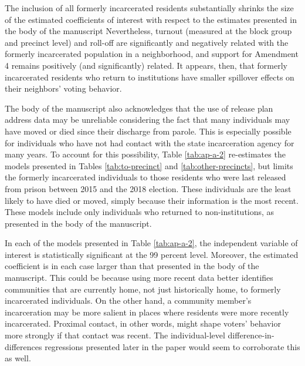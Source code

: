 \documentclass[
  12pt,
]{article}
\begin{document}
\begin{singlespace}


\end{singlespace}

The inclusion of all formerly incarcerated residents substantially shrinks the size of the estimated coefficients of interest with respect to the estimates presented in the body of the manuscript Nevertheless, turnout (measured at the block group and precinct level) and roll-off are significantly and negatively related with the formerly incarcerated population in a neighborhood, and support for Amendment 4 remains positively (and significantly) related. It appears, then, that formerly incarcerated residents who return to institutions have smaller spillover effects on their neighbors' voting behavior.

The body of the manuscript also acknowledges that the use of release plan address data may be unreliable considering the fact that many individuals may have moved or died since their discharge from parole. This is especially possible for individuals who have not had contact with the state incarceration agency for many years. To account for this possibility, Table \ref{tab:ap-a-2} re-estimates the models presented in Tables \ref{tab:to-precinct} and \ref{tab:other-precincts}, but limits the formerly incarcerated individuals to those residents who were last released from prison between 2015 and the 2018 election. These individuals are the least likely to have died or moved, simply because their information is the most recent. These models include only individuals who returned to non-institutions, as presented in the body of the manuscript.

\begin{singlespace}


\end{singlespace}

In each of the models presented in Table \ref{tab:ap-a-2}, the independent variable of interest is statistically significant at the 99 percent level. Moreover, the estimated coefficient is in each case larger than that presented in the body of the manuscript. This could be because using more recent data better identifies communities that are currently home, not just historically home, to formerly incarcerated individuals. On the other hand, a community member's incarceration may be more salient in places where residents were more recently incarcerated. Proximal contact, in other words, might shape voters' behavior more strongly if that contact was recent. The individual-level difference-in-differences regressions presented later in the paper would seem to corroborate this as well.
\end{document}
